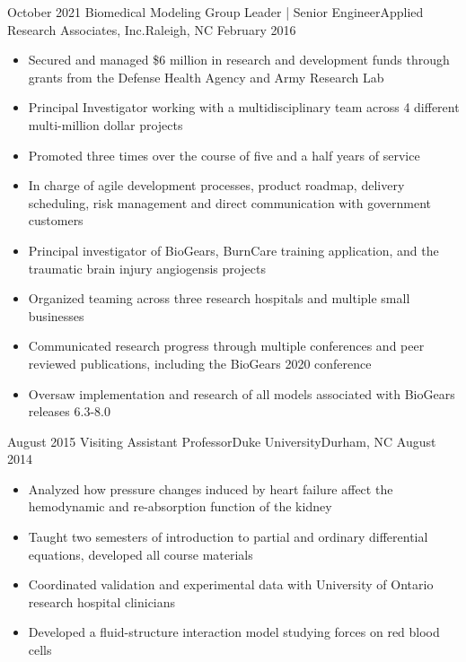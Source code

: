\begin{experiences}
{\begin{itemize}
                      \end{itemize}
                    }
                    {}
  \emptySeparator
  \experience
    {October 2021} {Biomedical Modeling Group Leader | Senior Engineer}{Applied Research Associates, Inc.}{Raleigh, NC}
    {February 2016}{
                      \begin{itemize}
                        \item Secured and managed \$6 million in research and development funds through grants from the Defense Health Agency and Army Research Lab
                        \item Principal Investigator working with a multidisciplinary team across 4 different multi-million dollar projects    
                        \item Promoted three times over the course of five and a half years of service                       
                        \item In charge of agile development processes, product roadmap, delivery scheduling, risk management and direct communication with government customers
                        \item Principal investigator of BioGears, BurnCare training application, and the traumatic brain injury angiogensis projects                
                        \item Organized teaming across three research hospitals and multiple small businesses
                        \item Communicated research progress through multiple conferences and peer reviewed publications, including the BioGears 2020 conference
                        \item Oversaw implementation and research of all models associated with BioGears releases 6.3-8.0                                                   
                      \end{itemize}
                    }
                    {}
  \emptySeparator
  \experience
    {August 2015}     {Visiting Assistant Professor}{Duke University}{Durham, NC}
    {August 2014}{
                      \begin{itemize}
                        \item Analyzed how pressure changes induced by heart failure affect the hemodynamic and re-absorption function of the kidney
                        \item Taught two semesters of introduction to partial and ordinary differential equations, developed all course materials                
                        \item Coordinated validation and experimental data with University of Ontario research hospital clinicians                   
                        \item Developed a fluid-structure interaction model studying forces on red blood cells 
                      \end{itemize}
                    }
                    {}

\end{experiences}
